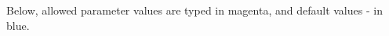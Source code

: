 \documentclass[12pt]{article}
\begin{document}
Below, allowed parameter values are typed in magenta, and default values - in blue.




\newcommand{\pright}[1]{\begin{flushright} \begin{minipage}{0.8\textwidth}\raggedright #1 \end{minipage} \end{flushright}}

\newcommand{\optSection}[1]{\subsection{#1}}
\newcommand{\optName}[1]{\hypertarget{#1}{\textcolor{violet}{\texttt{--#1}}}}
\newcommand{\optValue}[1]{\pright{\textcolor[rgb]{0,0.5,0}{default: \texttt{#1}}}}
\newcommand{\optLine}[1]{\pright{#1}}
\newenvironment{optTable}{}{}
\newenvironment{optOptTable}{\begin{flushright} \begin{minipage}{0.75\textwidth}\raggedright }{\end{minipage}\end{flushright}}

\newcommand{\optOpt}[1]{\textcolor{blue}{\texttt{#1}}\par}
\newcommand{\optOptLine}[1]{{\hangpara{0.3in}{0}#1\par}}


\end{document}
